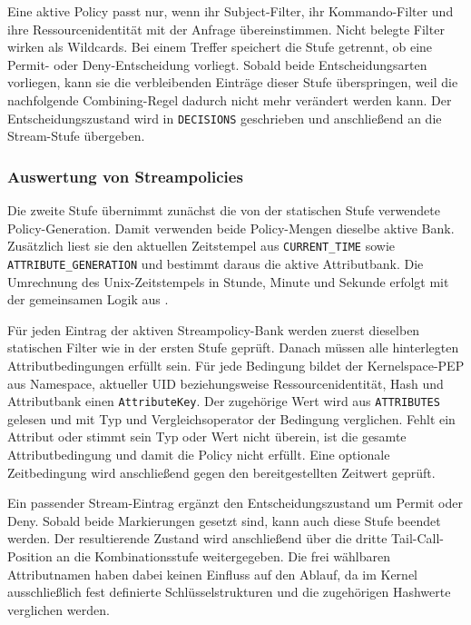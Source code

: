 Eine aktive Policy passt nur, wenn ihr Subject-Filter, ihr Kommando-Filter und ihre Ressourcenidentität mit der Anfrage übereinstimmen. Nicht belegte Filter wirken als Wildcards. Bei einem Treffer speichert die Stufe getrennt, ob eine Permit- oder Deny-Entscheidung vorliegt. Sobald beide Entscheidungsarten vorliegen, kann sie die verbleibenden Einträge dieser Stufe überspringen, weil die nachfolgende Combining-Regel dadurch nicht mehr verändert werden kann. Der Entscheidungszustand wird in \texttt{DECISIONS} geschrieben und anschließend an die Stream-Stufe übergeben.

\subsubsection{Auswertung von Streampolicies}
Die zweite Stufe übernimmt zunächst die von der statischen Stufe verwendete Policy-Generation. Damit verwenden beide Policy-Mengen dieselbe aktive Bank. Zusätzlich liest sie den aktuellen Zeitstempel aus \texttt{CURRENT\_TIME} sowie \texttt{ATTRIBUTE\_GENERATION} und bestimmt daraus die aktive Attributbank. Die Umrechnung des Unix-Zeitstempels in Stunde, Minute und Sekunde erfolgt mit der gemeinsamen Logik aus .

Für jeden Eintrag der aktiven Streampolicy-Bank werden zuerst dieselben statischen Filter wie in der ersten Stufe geprüft. Danach müssen alle hinterlegten Attributbedingungen erfüllt sein. Für jede Bedingung bildet der Kernelspace-PEP aus Namespace, aktueller UID beziehungsweise Ressourcenidentität, Hash und Attributbank einen \texttt{AttributeKey}. Der zugehörige Wert wird aus \texttt{ATTRIBUTES} gelesen und mit Typ und Vergleichsoperator der Bedingung verglichen. Fehlt ein Attribut oder stimmt sein Typ oder Wert nicht überein, ist die gesamte Attributbedingung und damit die Policy nicht erfüllt. Eine optionale Zeitbedingung wird anschließend gegen den bereitgestellten Zeitwert geprüft.

Ein passender Stream-Eintrag ergänzt den Entscheidungszustand um Permit oder Deny. Sobald beide Markierungen gesetzt sind, kann auch diese Stufe beendet werden. Der resultierende Zustand wird anschließend über die dritte Tail-Call-Position an die Kombinationsstufe weitergegeben. Die frei wählbaren Attributnamen haben dabei keinen Einfluss auf den Ablauf, da im Kernel ausschließlich fest definierte Schlüsselstrukturen und die zugehörigen Hashwerte verglichen werden.





